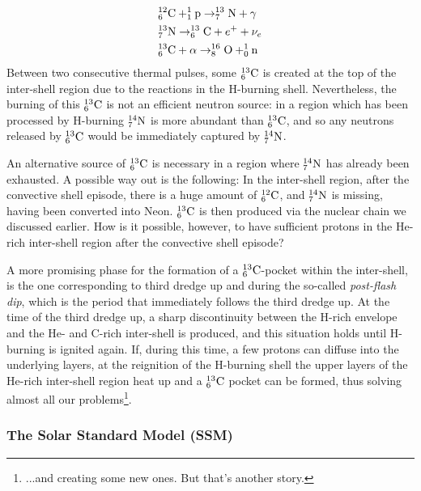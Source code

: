 \begin{align*}
    & \element{C}{12}{6}+\element{p}{1}{1} \to \element{N}{13}{7}+\gamma\\
    & \element{N}{13}{7} \to \element{C}{13}{6}+e^{+}+\nu_{e}\\
    & \element{C}{13}{6}+\alpha \to \element{O}{16}{8}+\element{n}{1}{0}
\end{align*}
Between two consecutive thermal pulses, some $\element{C}{13}{6}$ is created at the top of the inter-shell region due to the reactions in the H-burning shell. Nevertheless, the burning of this $\element{C}{13}{6}$ is not an efficient neutron source: in a region which has been processed by H-burning $\element{N}{14}{7}$ is more abundant than $\element{C}{13}{6}$, and so any neutrons released by $\element{C}{13}{6}$ would be immediately captured by $\element{N}{14}{7}$.
\par An alternative source of $\element{C}{13}{6}$ is necessary in a region where $\element{N}{14}{7}$ has already been exhausted. A possible way out is the following: In the inter-shell region, after the convective shell episode, there is a huge amount of $\element{C}{12}{6}$, and $\element{N}{14}{7}$ is missing, having been converted into Neon. $\element{C}{13}{6}$ is then produced via the nuclear chain we discussed earlier. How is it possible, however, to have sufficient protons in the He-rich inter-shell region after the convective shell episode?
\par A more promising phase for the formation of a $\element{C}{13}{6}$-pocket within the inter-shell, is the one corresponding to third dredge up and during the so-called \emph{post-flash dip}, which is the period that immediately follows the third dredge up. At the time of the third dredge up, a sharp discontinuity between the H-rich envelope and the He- and C-rich inter-shell is produced, and this situation holds until H-burning is ignited again. If, during this time, a few protons can diffuse into the underlying layers, at the reignition of the H-burning shell the upper layers of the He-rich inter-shell region heat up and a $\element{C}{13}{6}$ pocket can be formed, thus solving almost all our problems\footnote{...and creating some new ones. But that's another story.}.

\subsubsection*{The Solar Standard Model (SSM)}

